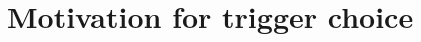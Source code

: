 \documentclass[12pt]{cms-tdr}
\begin{document}









\appendix

\section{Motivation for trigger choice}
\label{sec:motivation_for_trigger_choice}
\end{document}
